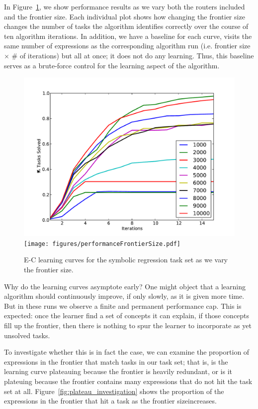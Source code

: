\documentclass{article}
\begin{document}
In Figure~\ref{fig:symreg}, we show performance results as we vary
both the routers included and the frontier size. Each individual plot
shows how changing the frontier size changes the number of tasks the
algorithm identifies correctly over the course of ten algorithm
iterations. In addition, we have a baseline for each curve, visits the
same number of expressions as the corresponding algorithm run
(i.e. frontier size $\times$ $\#$ of iterations) but all at once; it
does not do any learning. Thus, this baseline serves as a brute-force
control for the learning aspect of the algorithm. 

\begin{figure}

\includegraphics[width=\linewidth]{figures/learningCurves.pdf}
\texttt{[image: figures/performanceFrontierSize.pdf]}
\caption{E-C learning curves for the symbolic regression task set as
  we vary the frontier size.}
\label{fig:symreg} 
\end{figure}


Why do the learning curves asymptote early? One might object that a
learning algorithm should continuously improve, if only slowly, as it
is given more time. But in these runs we observe a finite and
permanent performance cap. This is expected: once the learner find a
set of concepts it can explain, if those concepts fill up the
frontier, then there is nothing to spur the learner to incorporate as
yet unsolved tasks. 

To investigate whether this is in fact the case, we can examine the
proportion of expressions in the frontier that match tasks in our task
set; that is, is the learning curve plateauing because the frontier is
heavily redundant, or is it plateuing because the frontier contains
many expressions that do not hit the task set at
all. Figure~\ref{fig:plateau_investigation} shows the proportion of
the expressions in the frontier that hit a task as the frontier sizeincreases.
\end{document}
